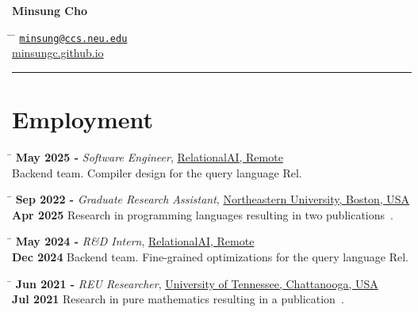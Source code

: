 \documentclass[11pt]{article} %
\begin{document}

\parbox{0.5\textwidth}{ %
\huge{\textbf{Minsung Cho}}
}
\hfill %
\parbox{0.5\textwidth}{ %
\begin{tabbing} %
\hspace{3cm} \= \hspace{4cm} \= \kill %
\href{mailto:minsung@ccs.neu.edu}{\texttt{minsung@ccs.neu.edu}} \\ %
\href{https://minsungc.github.io}{minsungc.github.io}
\end{tabbing}}

\hrule


\newcommand{\job}[6]{
\begin{tabbing}
\hspace{2.5cm} \= \kill
\textbf{#1} \> \textit{#5}, \href{#4}{#3} \\
\hspace{0.5cm}\textbf{#2} \> \hspace{0.5cm}#6
\end{tabbing}
}

\section{Employment}

\job
{May 2025 -}{}
{RelationalAI, Remote}
{http://relational.ai}
{Software Engineer}
{Backend team. Compiler design for the query language Rel.}

\job
{Sep 2022 -}{Apr 2025}
{Northeastern University, Boston, USA}
{http://prl.khoury.northeastern.edu}
{Graduate Research Assistant}
{Research in programming languages resulting in two publications~\cite{cho2025,lincroft2024}.}

\job
{May 2024 -}{Dec 2024}
{RelationalAI, Remote}
{http://relational.ai}
{R\&D Intern}
{Backend team. Fine-grained optimizations for the query language Rel.}

\job
{Jun 2021 -}{Jul 2021}
{University of Tennessee, Chattanooga, USA}
{http://www.utc.edu}
{REU Researcher}
{Research in pure mathematics resulting in a publication~\cite{cho2021krein}.}
\end{document}
